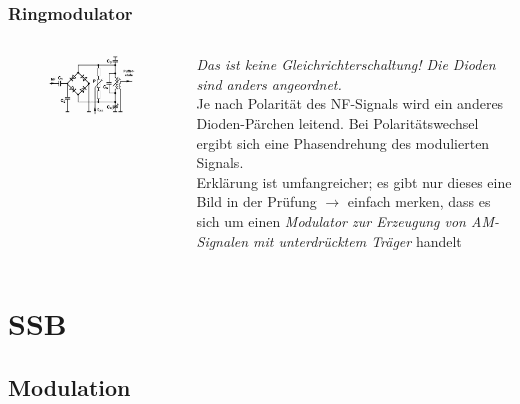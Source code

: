 \begin{frame}
  \frametitle{Ringmodulator}
  \begin{columns}
    \begin{figure}
      \includegraphics[width=\textwidth,height=.8\textheight,keepaspectratio]{a12/td513.png}
    \end{figure}
    \emph{Das ist keine Gleichrichterschaltung! Die Dioden sind anders angeordnet.}\\[1.5em]
    Je nach Polarität des NF-Signals wird ein anderes Dioden-Pärchen leitend. Bei Polaritätswechsel ergibt sich eine Phasendrehung des modulierten Signals.\\[2.5em]
    {\small Erklärung ist umfangreicher; es gibt nur dieses eine Bild in der Prüfung $\rightarrow$ einfach merken, dass es sich um einen \emph{Modulator zur Erzeugung von AM-Signalen mit unterdrücktem Träger} handelt}
  \end{columns}

\end{frame}


\section{SSB}

\subsection{Modulation}

